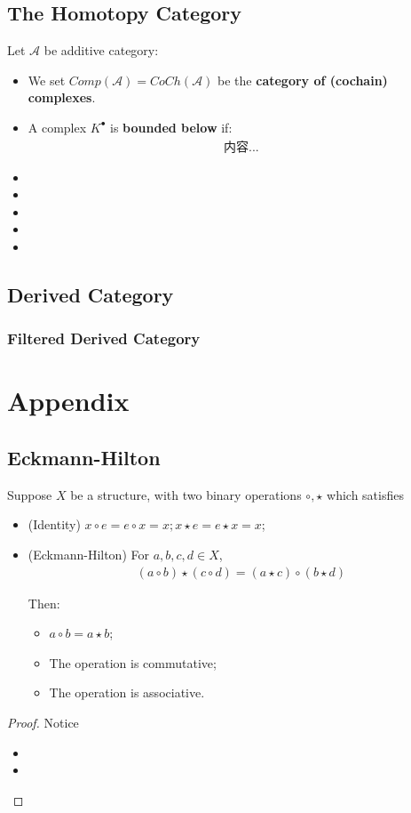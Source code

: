 \documentclass[Total.tex]{subfiles}
\begin{document}
		\section{The Homotopy Category}
			\begin{Def}
				Let $\mathcal{A}$ be additive category:
				\begin{itemize}
					\item We set $Comp(\mathcal{A})=CoCh(\mathcal{A})$ be the \textbf{category of (cochain) complexes}.
					\item A complex $K^\bullet$ is \textbf{bounded below} if:
					\begin{gather*}
						内容...
					\end{gather*}
					\item 
					\item 
					\item 
					\item 
					\item 
				\end{itemize}
			\end{Def}
		\section{Derived Category}
			\subsection{Filtered Derived Category}
		\chapter{Appendix}
			\section{Eckmann-Hilton}
				\begin{theorem}
					Suppose $X$ be a structure, with two binary operations $\circ,\star$ which satisfies
					\begin{itemize}
						\item (Identity) $x\circ e=e\circ x=x;x\star e=e\star x=x$;
						\item (Eckmann-Hilton) For $a,b,c,d\in X$,
						\begin{gather*}
							(a\circ b)\star(c\circ d)=(a\star c)\circ (b\star d)
						\end{gather*}
						
						Then:
						\begin{itemize}
							\item $a\circ b=a\star b$;
							\item The operation is commutative;
							\item The operation is associative.
						\end{itemize}
					\end{itemize}
				\end{theorem}
				\begin{proof}
					Notice
					\begin{itemize}
						\item 
						\item 
					\end{itemize}
				\end{proof}
	
\end{document}
